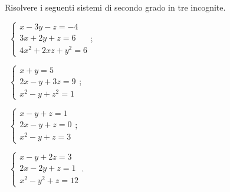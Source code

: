 \begin{esercizio}
 \label{ese:6.12}
Risolvere i seguenti sistemi di secondo grado in tre incognite.
\begin{multicols}{2}
 \begin{enumeratea}
 \item~$\left\{\begin{array}{l}x-3y-z=-4\\3x+2y+z=6\\4x^2+2xz+y^2=6\end{array}\right.$;
 \item~$\left\{\begin{array}{l}x+y=5\\2x-y+3z=9\\x^2-y+z^2=1\end{array}\right.$;
 \item~$\left\{\begin{array}{l}x-y+z=1\\2x-y+z=0\\x^2-y+z=3\end{array}\right.$;
 \item~$\left\{\begin{array}{l}x-y+2z=3\\2x-2y+z=1\\x^2-y^2+z=12\end{array}\right.$.
 \end{enumeratea}
 \end{multicols}
\end{esercizio}

